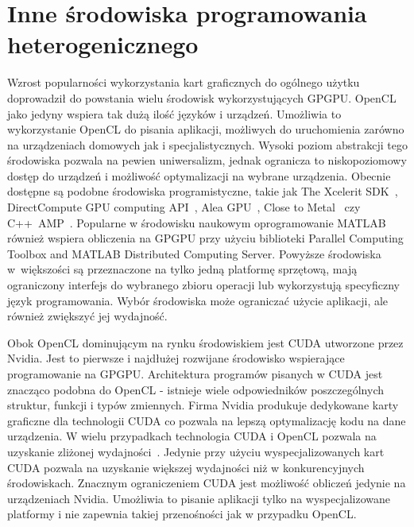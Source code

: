 \section{Inne środowiska programowania heterogenicznego}\label{sec:OpenC61asdL}

Wzrost popularności wykorzystania kart graficznych do ogólnego użytku doprowadził do powstania wielu środowisk wykorzystujących GPGPU. OpenCL jako jedyny wspiera tak dużą ilość języków i urządzeń. Umożliwia to wykorzystanie OpenCL do pisania aplikacji, możliwych do uruchomienia zarówno na urządzeniach domowych jak i specjalistycznych. Wysoki poziom abstrakcji tego środowiska pozwala na pewien uniwersalizm, jednak ogranicza to niskopoziomowy dostęp do urządzeń i możliwość optymalizacji na wybrane urządzenia. Obecnie dostępne są podobne środowiska programistyczne, takie jak The Xcelerit SDK~\cite{b30},  DirectCompute GPU computing API~\cite{b31}, Alea GPU~\cite{b32}, Close to Metal~\cite{b33} czy C++~AMP~\cite{b34}. Popularne w środowisku naukowym oprogramowanie MATLAB również wspiera obliczenia na GPGPU przy użyciu biblioteki Parallel Computing Toolbox and MATLAB Distributed Computing Server. Powyższe środowiska w~większości są przeznaczone na tylko jedną platformę sprzętową, mają ograniczony interfejs do wybranego zbioru operacji lub wykorzystują specyficzny język programowania. Wybór środowiska może ograniczać użycie aplikacji, ale również zwiększyć jej wydajność.

Obok OpenCL dominującym na rynku środowiskiem jest CUDA utworzone przez Nvidia. Jest to pierwsze i najdłużej rozwijane środowisko wspierające programowanie na GPGPU. Architektura programów pisanych w CUDA jest znacząco podobna do OpenCL - istnieje wiele odpowiedników poszczególnych struktur, funkcji i typów zmiennych. Firma Nvidia produkuje dedykowane karty graficzne dla technologii CUDA co pozwala na lepszą optymalizację kodu na dane urządzenia. W wielu przypadkach technologia CUDA i OpenCL pozwala na uzyskanie zliżonej wydajności~\cite{b35}. Jedynie przy użyciu wyspecjalizowanych kart CUDA pozwala na uzyskanie większej wydajności niż w konkurencyjnych środowiskach. Znacznym ograniczeniem CUDA jest możliwość obliczeń jedynie na urządzeniach Nvidia. Umożliwia to pisanie aplikacji tylko na wyspecjalizowane platformy i nie zapewnia takiej przenośności jak w przypadku OpenCL.



